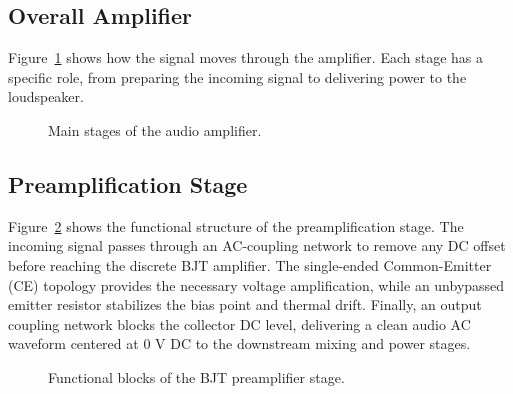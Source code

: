 \documentclass[conference,letterpaper]{IEEEtran}
\newcommand{\Ohm}{\Omega}
\newcommand{\V}{\mathrm{V}}
\begin{document}
\subsection{Overall Amplifier}

Figure~\ref{fig:overall} shows how the signal moves through the
amplifier. Each stage has a specific role, from preparing the incoming
signal to delivering power to the loudspeaker.

\begin{figure}[H]
\centering
{}
\caption{Main stages of the audio amplifier.}
\label{fig:overall}
\end{figure}
\FloatBarrier

\subsection{Preamplification Stage}
Figure~\ref{fig:block_preamp} shows the functional structure of the preamplification stage. The incoming signal passes through an AC-coupling network to remove any DC offset before reaching the discrete BJT amplifier. The single-ended Common-Emitter (CE) topology provides the necessary voltage amplification, while an unbypassed emitter resistor stabilizes the bias point and thermal drift. Finally, an output coupling network blocks the collector DC level, delivering a clean audio AC waveform centered at $0\text{~V}$ DC to the downstream mixing and power stages.

\begin{figure}[H]
\centering
{}
\caption{Functional blocks of the BJT preamplifier stage.}
\label{fig:block_preamp}
\end{figure}
\FloatBarrier
\end{document}
